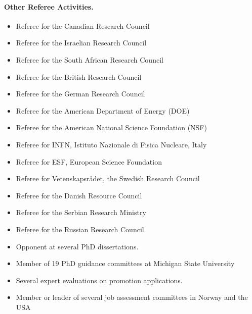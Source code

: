 \documentclass[%
oneside,                 %
final,                   %
10pt]{article}
\begin{document}
\noindent
\paragraph{Other Referee Activities.}
\begin{itemize}
\item Referee for the Canadian Research Council

\item Referee for the Israelian Research Council

\item Referee for the South African Research Council

\item Referee for the British Research Council

\item Referee for the German Research Council

\item Referee for the American Department of Energy (DOE)

\item Referee for the American National Science Foundation (NSF)

\item Referee for INFN, Istituto Nazionale di Fisica Nucleare, Italy

\item Referee for ESF, European Science Foundation

\item Referee for Vetenskapsrådet, the Swedish Research Council

\item Referee for the Danish Resource Council

\item Referee for the Serbian Research Ministry

\item Referee for the Russian Research Council

\item Opponent at several PhD dissertations.

\item Member of 19 PhD guidance committees at Michigan State University

\item Several expert evaluations on promotion applications.

\item Member or leader of several job assessment committees in Norway and the USA
\end{itemize}
\end{document}
